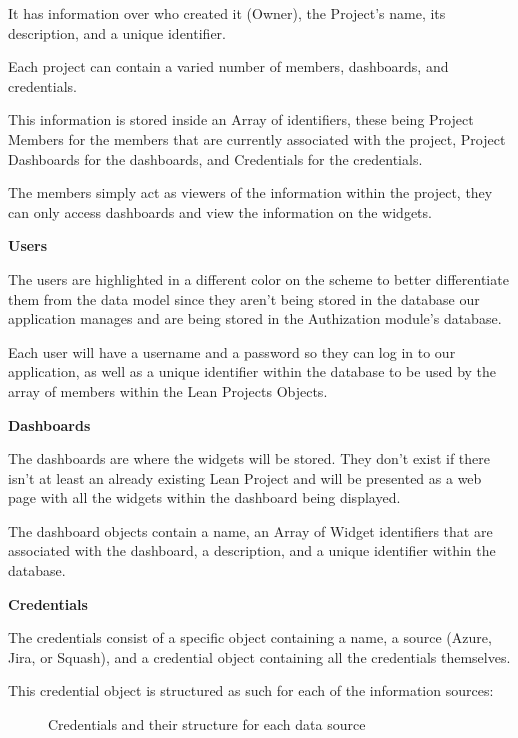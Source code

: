\documentclass[a4paper,twoside,10pt]{report}
\begin{document}
It has information over who created it (Owner), the Project's name, its description, and a unique identifier.

Each project can contain a varied number of members, dashboards, and credentials. 

This information is stored inside an Array of identifiers, these being Project Members for the members that are currently associated with the project, Project Dashboards for the dashboards, and Credentials for the credentials.

The members simply act as viewers of the information within the project, they can only access dashboards and view the information on the widgets.


\textbf{Users}

The users are highlighted in a different color on the scheme to better differentiate them from the data model since they aren't being stored in the database our application manages and are being stored in the Authization module's database.

Each user will have a username and a password so they can log in to our application, as well as a unique identifier within the database to be used by the array of members within the Lean Projects Objects.


\textbf{Dashboards}

The dashboards are where the widgets will be stored. They don't exist if there isn't at least an already existing Lean Project and will be presented as a web page with all the widgets within the dashboard being displayed.

The dashboard objects contain a name, an Array of Widget identifiers that are associated with the dashboard, a description, and a unique identifier within the database.


\textbf{Credentials}

The credentials consist of a specific object containing a name, a source (Azure, Jira, or Squash), and a credential object containing all the credentials themselves.

This credential object is structured as such for each of the information sources:

\begin{figure}[h!]
\center
\caption{Credentials and their structure for each data source}
\end{figure}
\end{document}
